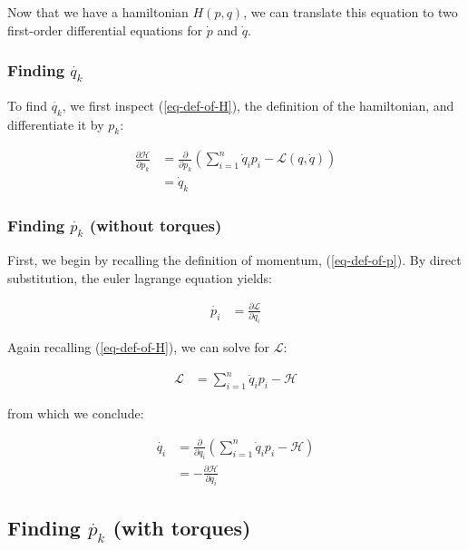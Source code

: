 \documentclass{article}
\begin{document}
Now that we have a hamiltonian $H(p,q)$, we can translate this equation to two first-order
	differential equations for $\dot{p}$ and $\dot{q}$.

\subsubsection{Finding $\dot{q_k}$}

To find $\dot{q_k}$, we first inspect (\ref{eq-def-of-H}), the definition of the hamiltonian,
	and differentiate it by $p_k$:

\begin{align}
	\frac{\partial \mathcal{H}}{\partial p_k} & = \frac{\partial}{\partial p_k}
		\left( \sum_{i=1}^n \dot{q}_i p_i - \mathcal{L}(q,\dot{q}) \right) \nonumber \\
		& = \dot{q}_k \label{eq-q-dot-derivation}
\end{align}

\subsubsection{Finding $\dot{p_k}$ (without torques) }

First, we begin by recalling the definition of momentum, (\ref{eq-def-of-p}).
By direct substitution, the euler lagrange equation yields:

\begin{align}
	\dot{p_i}
	& = \frac {\partial \mathcal{L}} {\partial q_i} \nonumber
\end{align}

Again recalling (\ref{eq-def-of-H}), we can solve for $\mathcal{L}$:

\begin{align}
	\mathcal{L} & = \sum_{i=1}^n \dot{q}_i p_i - \mathcal{H} \nonumber
\end{align}

from which we conclude:

\begin{align}
	\dot{q_i}
	& = \frac {\partial} {\partial q_i}
	\left( \sum_{i=1}^n \dot{q}_i p_i - \mathcal{H} \right)  \nonumber\\
	& = - \frac{\partial \mathcal{H} }{\partial q_i} \label{eq-p-dot-no-torques-derivation}
\end{align}

\subsection{Finding $\dot{p_k}$ (with torques)}
\end{document}
